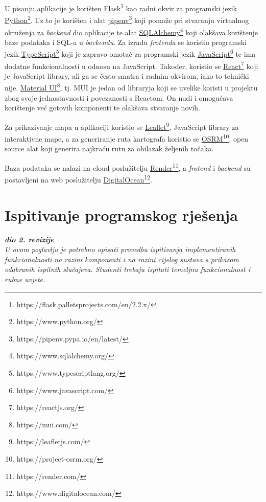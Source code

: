             U pisanju aplikacije je korišten \underline{Flask}\footnote{https://flask.palletsprojects.com/en/2.2.x/} kao radni okvir za programski jezik \underline{Python}\footnote{https://www.python.org/}. Uz to je korišten i alat \underline{pipenv}\footnote{https://pipenv.pypa.io/en/latest/} koji pomaže pri stvaranju virtualnog okruženja za \textit{backend} dio aplikacije te alat \underline{SQLAlchemy}\footnote{https://www.sqlalchemy.org/} koji olakšava korištenje baze podataka i SQL-a u \textit{backendu}. Za izradu \textit{frotenda} se koristio programski jezik \underline{TypeScript}\footnote{https://www.typescriptlang.org/} koji je zapravo omotač za programski jezik \underline{JavaScript}\footnote{https://www.javascript.com/} te ima dodatne funkcionalnosti u odnosu na JavaScript. Također, koristio se \underline{React}\footnote{https://reactjs.org/} koji je JavaScript library, ali ga se često smatra i radnim okvirom, iako to tehnički nije. \underline{Material UI}\footnote{https://mui.com/}, tj. MUI je jedan od libraryja koji se uvelike koristi u projektu zbog svoje jednostavnosti i povezanosti s Reactom. On nudi i omogućava korištenje već gotovih komponenti te olakšava stvaranje novih. \par
            
            Za prikazivanje mapa u aplikaciji koristio se \underline{Leaflet}\footnote{https://leafletjs.com/}, JavaScript library za interaktivne mape, a za generiranje ruta kartografa koristio se \underline{OSRM}\footnote{https://project-osrm.org/}, open source alat koji generira najkraću rutu za obilazak željenih točaka.
            
            Baza podataka se nalazi na cloud poslužitelju \underline{Render}\footnote{https://render.com/}, a \textit{frotend} i \textit{backend} su postavljeni na web poslužitelju \underline{DigitalOcean}\footnote{https://www.digitalocean.com/}. \par
			
			
			\eject 
		
	
		\section{Ispitivanje programskog rješenja}
			
			\textbf{\textit{dio 2. revizije}}\\
			
			 \textit{U ovom poglavlju je potrebno opisati provedbu ispitivanja implementiranih funkcionalnosti na razini komponenti i na razini cijelog sustava s prikazom odabranih ispitnih slučajeva. Studenti trebaju ispitati temeljnu funkcionalnost i rubne uvjete.}
	

